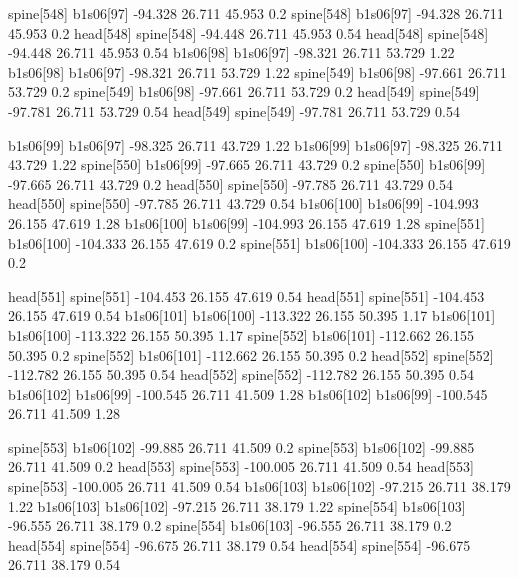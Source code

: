 spine[548]    b1s06[97]    -94.328    26.711    45.953    0.2
spine[548]    b1s06[97]    -94.328    26.711    45.953    0.2
head[548]    spine[548]    -94.448    26.711    45.953    0.54
head[548]    spine[548]    -94.448    26.711    45.953    0.54
b1s06[98]    b1s06[97]    -98.321    26.711    53.729    1.22
b1s06[98]    b1s06[97]    -98.321    26.711    53.729    1.22
spine[549]    b1s06[98]    -97.661    26.711    53.729    0.2
spine[549]    b1s06[98]    -97.661    26.711    53.729    0.2
head[549]    spine[549]    -97.781    26.711    53.729    0.54
head[549]    spine[549]    -97.781    26.711    53.729    0.54


b1s06[99]    b1s06[97]    -98.325    26.711    43.729    1.22
b1s06[99]    b1s06[97]    -98.325    26.711    43.729    1.22
spine[550]    b1s06[99]    -97.665    26.711    43.729    0.2
spine[550]    b1s06[99]    -97.665    26.711    43.729    0.2
head[550]    spine[550]    -97.785    26.711    43.729    0.54
head[550]    spine[550]    -97.785    26.711    43.729    0.54
b1s06[100]    b1s06[99]    -104.993    26.155    47.619    1.28
b1s06[100]    b1s06[99]    -104.993    26.155    47.619    1.28
spine[551]    b1s06[100]    -104.333    26.155    47.619    0.2
spine[551]    b1s06[100]    -104.333    26.155    47.619    0.2


head[551]    spine[551]    -104.453    26.155    47.619    0.54
head[551]    spine[551]    -104.453    26.155    47.619    0.54
b1s06[101]    b1s06[100]    -113.322    26.155    50.395    1.17
b1s06[101]    b1s06[100]    -113.322    26.155    50.395    1.17
spine[552]    b1s06[101]    -112.662    26.155    50.395    0.2
spine[552]    b1s06[101]    -112.662    26.155    50.395    0.2
head[552]    spine[552]    -112.782    26.155    50.395    0.54
head[552]    spine[552]    -112.782    26.155    50.395    0.54
b1s06[102]    b1s06[99]    -100.545    26.711    41.509    1.28
b1s06[102]    b1s06[99]    -100.545    26.711    41.509    1.28


spine[553]    b1s06[102]    -99.885    26.711    41.509    0.2
spine[553]    b1s06[102]    -99.885    26.711    41.509    0.2
head[553]    spine[553]    -100.005    26.711    41.509    0.54
head[553]    spine[553]    -100.005    26.711    41.509    0.54
b1s06[103]    b1s06[102]    -97.215    26.711    38.179    1.22
b1s06[103]    b1s06[102]    -97.215    26.711    38.179    1.22
spine[554]    b1s06[103]    -96.555    26.711    38.179    0.2
spine[554]    b1s06[103]    -96.555    26.711    38.179    0.2
head[554]    spine[554]    -96.675    26.711    38.179    0.54
head[554]    spine[554]    -96.675    26.711    38.179    0.54


